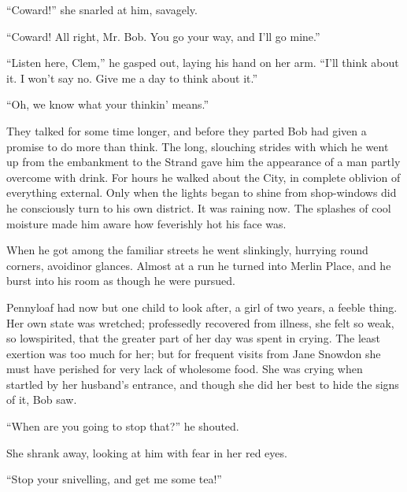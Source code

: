 ``Coward!'' she snarled at him, savagely.

``Coward! All right, Mr. Bob. You go your way, and I'll go mine.''

``Listen here, Clem,'' he gasped out, laying his hand on her arm. ``I'll
think about it. I won't say no. Give me a day to think about it.''

``Oh, we know what your thinkin' means.''

They talked for some time longer, and before they parted Bob had given a
promise to do more than think. The long, slouching strides with which he
went up from the embankment to the Strand gave him the appearance of a
man partly overcome with drink. For hours he walked about the City, in
complete oblivion of {\protect\hypertarget{185}{}{}}everything external.
Only when the lights began to shine from shop-windows did he consciously
turn to his own district. It was raining now. The splashes of cool
moisture made him aware how feverishly hot his face was.

When he got among the familiar streets he went slinkingly, hurrying
round corners, avoidinor glances. Almost at a run he turned into Merlin
Place, and he burst into his room as though he were pursued.

Pennyloaf had now but one child to look after, a girl of two years, a
feeble thing. Her own state was wretched; professedly recovered from
illness, she felt so weak, so lowspirited, that the greater part of her
day was spent in crying. The least exertion was too much for her; but
for frequent visits from Jane Snowdon she must have perished for very
lack of wholesome food. She was crying when startled by her husband's
entrance, and though she did her best to hide the signs of it, Bob saw.

``When are you going to stop that?'' he shouted.

She shrank away, looking at him with fear in her red eyes.

{\protect\hypertarget{186}{}{}}``Stop your snivelling, and get me some
tea!''


